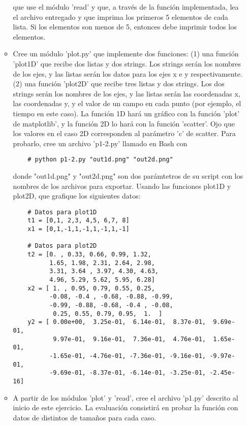 \documentclass{article}
\begin{document}
\begin{itemize}
\begin{itemize}
        que use el módulo 'read' y que, a través de la función implementada, lea el archivo entregado y que imprima los primeros 5 elementos de cada lista. Si los elementos son menos de 5, entonces debe imprimir todos los elementos.

        \item Cree un módulo 'plot.py' que implemente dos funciones: (1) una función 'plot1D' que recibe dos listas y dos strings. Los strings serán los nombres de los ejes, y las listas serán los datos para los ejes x e y respectivamente. (2) una función 'plot2D' que recibe tres listas y dos strings. Los dos strings serán los nombres de los ejes, y las listas serán las coordenadas x, las coordenadas y, y el valor de un campo en cada punto (por ejemplo, el tiempo en este caso). La función 1D hará un gráfico con la función 'plot' de matplotlib', y la función 2D lo hará con la función 'scatter'. Ojo que los valores en el caso 2D corresponden al parámetro 'c' de scatter. Para probarlo, cree un archivo 'p1-2.py' llamado en Bash con

    \begin{verbatim}
    # python p1-2.py "out1d.png" "out2d.png"
    \end{verbatim}
 
        donde "out1d.png" y "out2d.png" son dos parámtetros de su script con los nombres de los archivos para exportar. Usando las funciones plot1D y plot2D, que grafique los siguientes datos: 

    \begin{verbatim}
    # Datos para plot1D
    t1 = [0,1, 2,3, 4,5, 6,7, 8]
    x1 = [0,1,-1,1,-1,1,-1,1,-1]

    # Datos para plot2D
    t2 = [0. , 0.33, 0.66, 0.99, 1.32, 
          1.65, 1.98, 2.31, 2.64, 2.98, 
          3.31, 3.64 , 3.97, 4.30, 4.63, 
          4.96, 5.29, 5.62, 5.95, 6.28]
    x2 = [ 1. , 0.95, 0.79, 0.55, 0.25, 
          -0.08, -0.4 , -0.68, -0.88, -0.99, 
          -0.99, -0.88, -0.68, -0.4 , -0.08, 
           0.25, 0.55, 0.79, 0.95,  1.  ]
    y2 = [ 0.00e+00,  3.25e-01,  6.14e-01,  8.37e-01,  9.69e-01, 
           9.97e-01,  9.16e-01,  7.36e-01,  4.76e-01,  1.65e-01, 
          -1.65e-01, -4.76e-01, -7.36e-01, -9.16e-01, -9.97e-01, 
          -9.69e-01, -8.37e-01, -6.14e-01, -3.25e-01, -2.45e-16]
    \end{verbatim}

        \item A partir de los módulos 'plot' y 'read', cree el archivo 'p1.py' descrito al inicio de este ejercicio. La evaluación consistirá en probar la función con datos de distintos de tamaños para cada caso.


\end{itemize}
\end{itemize}
\end{document}
